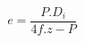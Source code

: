 \documentclass[12pt]{article}
\begin{document}
\begin{displaymath}
e = \frac {P . D_i} {4f . z - P}
\end{displaymath}
\end{document}
